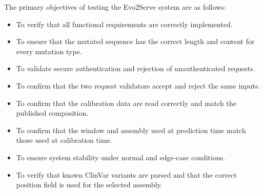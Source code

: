The primary objectives of testing the Evo2Serve system are as follows:
\begin{itemize}
\item To verify that all functional requirements are correctly implemented.
\item To ensure that the mutated sequence has the correct length and content for every mutation type.
\item To validate secure authentication and rejection of unauthenticated requests.
\item To confirm that the two request validators accept and reject the same inputs.
\item To confirm that the calibration data are read correctly and match the published composition.
\item To confirm that the window and assembly used at prediction time match those used at calibration time.
\item To ensure system stability under normal and edge-case conditions.
\item To verify that known ClinVar variants are parsed and that the correct position field is used for the selected assembly.
\end{itemize}


